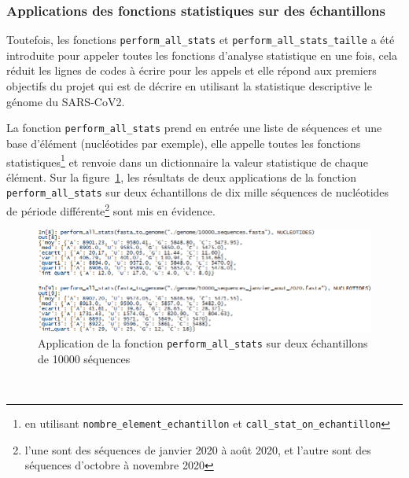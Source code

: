 \documentclass[12pt]{article}
\begin{document}
\subsubsection{Applications des fonctions statistiques sur des échantillons}
Toutefois, les fonctions \texttt{perform\_all\_stats} et \texttt{perform\_all\_stats\_taille} a été introduite pour appeler toutes les fonctions d'analyse statistique en une fois, cela réduit les lignes de codes à écrire pour les appels et elle répond aux premiers objectifs du projet qui est de décrire en utilisant la statistique descriptive le génome du SARS-CoV2.

La fonction \texttt{perform\_all\_stats} prend en entrée une liste de séquences et une base d'élément (nucléotides par exemple), elle appelle toutes les fonctions statistiques\footnote{en utilisant \texttt{nombre\_element\_echantillon} et \texttt{call\_stat\_on\_echantillon}} et renvoie dans un dictionnaire la valeur statistique de chaque élément. Sur la figure~\ref{appnucl10000seq}, les résultats de deux applications de la fonction \texttt{perform\_all\_stats} sur deux échantillons de dix mille séquences de nucléotides de période différente\footnote{l'une sont des séquences de janvier 2020 à août 2020, et l'autre sont des séquences d'octobre à novembre 2020} sont mis en évidence.
    \begin{figure}[!h]
        \centering
        \includegraphics[scale = 0.75]{Images/Stats/app_10000_seq.PNG}
        \caption{Application de la fonction \texttt{perform\_all\_stats} sur deux échantillons de 10000 séquences}
        \label{appnucl10000seq}
    \end{figure}\\

\newpage
    
\end{document}
